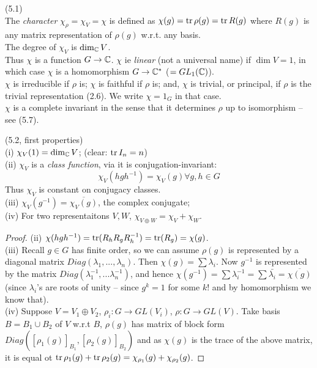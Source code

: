\documentclass[a4paper]{article}
\begin{document}
\begin{defi} (5.1)\\
The \emph{character} $\chi_\rho = \chi_V = \chi$ is defined as $\chi(g) = \operatorname{tr} \rho(g) = \operatorname{tr} R(g)$ where $R(g)$ is any matrix representation of $\rho(g)$ w.r.t. any basis.\\
The degree of $\chi_V$ is $\dim_{\mathbb{C}} V$.\\
Thus $\chi$ is a function $G \to \mathbb{C}$. $\chi$ ie \emph{linear} (not a universal name) if $\dim V=1$, in which case $\chi$ is a homomorphism $G \to \mathbb{C}^*$ ($=GL_1(\mathbb{C})$).\\
$\chi$ is irreducible if $\rho$ is; $\chi$ is faithful if $\rho$ is; and, $\chi$ is trivial, or principal, if $\rho$ is the trivial representation (2.6). We write $\chi = 1_G$ in that case.\\
$\chi$ is a complete invariant in the sense that it determines $\rho$ up to isomorphism -- see (5.7).
\end{defi}

\begin{thm} (5.2, first properties)\\
(i) $\chi_V(1) = \dim_{\mathbb{C}} V$; (clear: $\operatorname{tr} I_n = n$)\\
(ii) $\chi_V$ is a \emph{class function}, via it is conjugation-invariant: $$\chi_V (hgh^{-1}) = \chi_V(g) \forall g,h \in G$$
Thus $\chi_V$ is constant on conjugacy classes.\\
(iii) $\chi_V(g^{-1}) = \overline{\chi_V(g)}$, the complex conjugate;\\
(iv) For two representaitons $V,W$, $\chi_{V \oplus W} = \chi_V + \chi_W$.
\begin{proof}
(ii) $\chi(hgh^{-1}) = \operatorname{tr} (R_h R_g R^{-1}_h) = \operatorname{tr} (R_g) = \chi(g)$.\\
(iii) Recall $g \in G$ has finite order, so we can assume $\rho(g)$ is represented by a diagonal matrix $Diag(\lambda_1,...,\lambda_n)$. Then $\chi(g) = \sum \lambda_i$. Now $g^{-1}$ is represented by the matrix $Diag(\lambda_1^{-1},...\lambda_n^{-1})$, and hence $\chi(g^{-1}) = \sum \lambda_i^{-1} = \sum \bar{\lambda_i} = \overline{\chi(g)}$ (since $\lambda_i$'s are roots of unity -- since $g^k = 1$ for some $k$! and by homomorphism we know that).\\
(iv) Suppose $V = V_1 \oplus V_2$, $\rho_i : G \to GL(V_i)$, $\rho:G \to GL(V)$. Take basis $B = B_1 \cup B_2$ of $V$ w.r.t $B$, $\rho(g)$ has matrix of block form $Diag([\rho_1(g)]_{B_1},[\rho_2(g)]_{B_2})$ and as $\chi(g)$ is the trace of the above matrix, it is equal ot $\operatorname{tr} \rho_1(g)+ \operatorname{tr}\rho_2(g) = \chi_{\rho_1} (g) + \chi_{\rho_2}(g)$.
\end{proof}
\end{thm}
\end{document}
